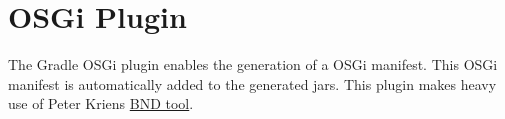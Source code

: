 \chapter{OSGi Plugin} %
\label{cha:osgi_plugin}
The Gradle OSGi plugin enables the generation of a OSGi manifest. This OSGi manifest is automatically added to the generated jars. This plugin makes heavy use of Peter Kriens \href{http://www.aqute.biz/Code/Bnd}{BND tool}. 
